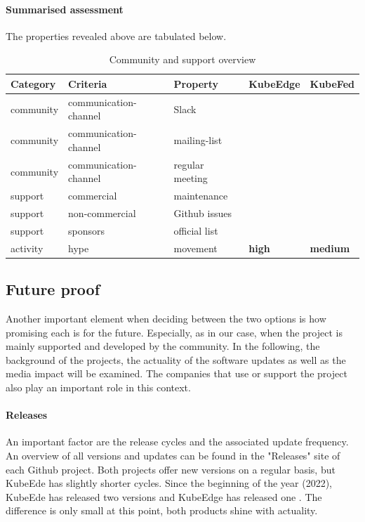 \documentclass[MIC,Master,english]{twbook}%
\newcommand{\cmark}{\ding{51}}%
\newcommand{\xmark}{\ding{55}}%
\begin{document}
\paragraph{Summarised assessment} The properties revealed above are tabulated below. 
\begin{table}[ht]
    \begin{center}
        \begin{tabular}{|l|l|l|l|l|}
            \hline
            Category & Criteria & Property & \textbf{KubeEdge} & \textbf{KubeFed} \\
            \hline
            community & communication-channel & Slack & \cmark & \cmark \\
            community & communication-channel & mailing-list & \cmark & \cmark \\
            community & communication-channel & regular meeting & \cmark & \cmark \\
            support & commercial & maintenance & \xmark & \xmark \\
            support & non-commercial & Github issues & \cmark & \cmark \\
            support & sponsors & official list & \cmark & \xmark \\
            activity & hype & movement & \textbf{high} & \textbf{medium} \\
            \hline
        \end{tabular}
        \caption{Community and support overview}
        \label{tab:cs-overview}
    \end{center}
\end{table}

\subsection{Future proof}
Another important element when deciding between the two options is how promising each is for the future. Especially, as in our case, when the project is mainly supported and developed by the community. In the following, the background of the projects, the actuality of the software updates as well as the media impact will be examined. The companies that use or support the project also play an important role in this context.

\paragraph{Releases} An important factor are the release cycles and the associated update frequency. An overview of all versions and updates can be found in the "Releases" site of each Github project. Both projects offer new versions on a regular basis, but KubeEde has slightly shorter cycles. Since the beginning of the year (2022), KubeEde has released two versions and KubeEdge has released one \cite{ke-releases-gh,kf-releases-gh}. The difference is only small at this point, both products shine with actuality.
\end{document}
